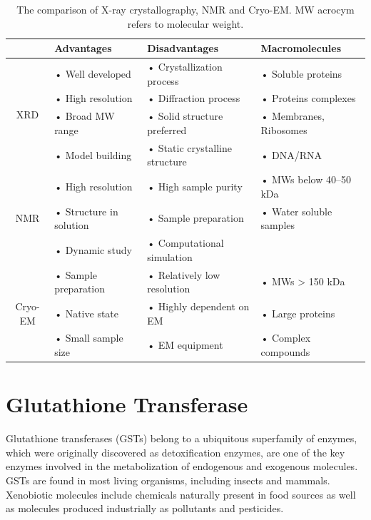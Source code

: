 \begin{table}[h!]
	\begin{tabular}{cp{4cm}p{5cm}p{4.5cm}}
		\hline
		& Advantages & Disadvantages & Macromolecules\\
		\hline
		\multirow{4}{*}{XRD} & • Well developed & • Crystallization process & • Soluble proteins \\
		& • High resolution & • Diffraction process
		& • Proteins complexes \\
		& • Broad MW range & • Solid structure preferred & • Membranes, Ribosomes \\
		& • Model building &• Static crystalline structure & • DNA/RNA \\
		\hline
		\multirow{3}{*}{NMR} & • High resolution & • High sample purity & • MWs below 40–50 kDa \\
		& • Structure in solution & • Sample preparation & • Water soluble samples\\
		& • Dynamic study	& • Computational simulation & \\
		\hline
		\multirow{3}{*}{Cryo-EM} & • Sample preparation & • Relatively low resolution
		& • MWs > 150 kDa\\
		& • Native state & • Highly dependent on EM & • Large proteins\\
		& • Small sample size	& • EM equipment & • Complex compounds \\
		\hline
	\end{tabular}
	\caption{The comparison of X-ray crystallography, NMR and Cryo-EM. MW acrocym refers to molecular weight.}
	\label{TAB1}
\end{table}

\section{Glutathione Transferase}
Glutathione transferases (GSTs) belong to a ubiquitous superfamily of enzymes, which were originally discovered as detoxification enzymes, are one of the key enzymes involved in the metabolization of endogenous and exogenous molecules\cite{F-Neiers-GSTs}. GSTs are found in most living organisms, including insects and mammals. Xenobiotic molecules include chemicals naturally present in food sources as well as molecules produced industrially as pollutants and pesticides.

